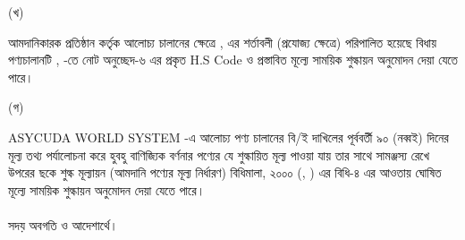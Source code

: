 \documentclass[12pt]{article}
\begin{document}
\begin{minipage}[t]{0.05\linewidth}
(খ)
\end{minipage}
\begin{minipage}[t]{0.90\linewidth}
আমদানিকারক প্রতিষ্ঠান কর্তৃক আলোচ্য চালানের
ক্ষেত্রে
{\srooof}, {\srooofd}
এর শর্তাবলী (প্রযোজ্য ক্ষেত্রে) পরিপালিত হয়েছে
বিধায় পণ্যচালানটি {\srooof}, {\srooofd}
{\cpcfzn} -তে নোট অনুচ্ছেদ-৬ এর প্রকৃত H.S Code
ও প্রস্তাবিত মূল্যে সাময়িক শুল্কায়ন অনুমোদন দেয়া যেতে পারে।
\\
\end{minipage}
\begin{minipage}[t]{0.05\linewidth}
\hspace{0em}
\end{minipage}
\begin{minipage}[t]{0.05\linewidth}
(গ)
\end{minipage}
\begin{minipage}[t]{0.90\linewidth}
ASYCUDA WORLD SYSTEM -এ আলোচ্য পণ্য চালানের বি/ই দাখিলের পূর্ববর্তী ৯০ (নব্বই) দিনের মূল্য তথ্য পর্যালোচনা করে হুবহু বাণিজ্যিক বর্ণনার পণ্যের যে শুল্কায়িত মূল্য পাওয়া যায় তার সাথে সামঞ্জস্য রেখে উপরের ছকে শুল্ক মূল্যায়ন (আমদানি পণ্যের মূল্য নির্ধারণ) বিধিমালা, ২০০০ ({\srofs}, {\srofsd}) এর বিধি-৪ এর আওতায় ঘোষিত মূল্যে সাময়িক শুল্কায়ন অনুমোদন দেয়া যেতে পারে।
\\
\\
সদয় অবগতি ও আদেশার্থে।
\end{minipage}
\thispagestyle{laststyle}
\end{document}
